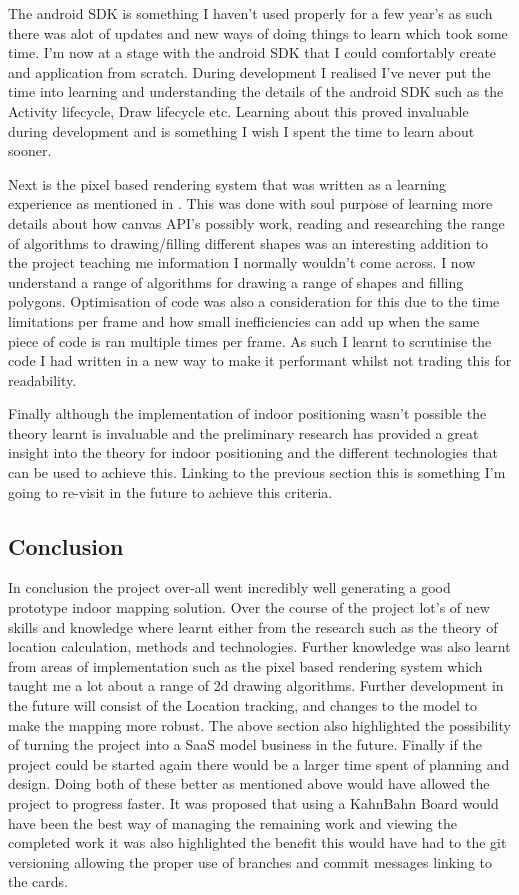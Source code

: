 The android SDK is something I haven't used properly for a few year's as such there was alot of updates and new ways of doing things to learn which took some time. I'm now at a stage with the android SDK that I could comfortably create and application from scratch. During development I realised I've never put the time into learning and understanding the details of the android SDK such as the Activity lifecycle, Draw lifecycle etc. Learning about this proved invaluable during development and is something I wish I spent the time to learn about sooner.

Next is the pixel based rendering system that was written as a learning experience as mentioned in \citetemp. This was done with soul purpose of learning more details about how canvas API's possibly work, reading and researching the range of algorithms to drawing/filling different shapes was an interesting addition to the project teaching me information I normally wouldn't come across. I now understand a range of algorithms for drawing a range of shapes and filling polygons. Optimisation of code was also a consideration for this due to the time limitations per frame and how small inefficiencies can add up when the same piece of code is ran multiple times per frame. As such I learnt to scrutinise the code I had written in a new way to make it performant whilst not trading this for readability.

Finally although the implementation of indoor positioning wasn't possible the theory learnt is invaluable and the preliminary research has provided a great insight into the theory for indoor positioning and the different technologies that can be used to achieve this. Linking to the previous section this is something I'm going to re-visit in the future to achieve this criteria.

\subsection{Conclusion}
In conclusion the project over-all went incredibly well generating a good prototype indoor mapping solution. Over the course of the project lot's of new skills and knowledge where learnt either from the research such as the theory of location calculation, methods and technologies. Further knowledge was also learnt from areas of implementation such as the pixel based rendering system which taught me a lot about a range of 2d drawing algorithms.
Further development in the future will consist of the Location tracking, and changes to the model to make the mapping more robust. The above section also highlighted the possibility of turning the project into a SaaS model business in the future.
Finally if the project could be started again there would be a larger time spent of planning and design. Doing both of these better as mentioned above would have allowed the project to progress faster. It was proposed that using a KahnBahn Board would have been the best way of managing the remaining work and viewing the completed work it was also highlighted the benefit this would have had to the git versioning allowing the proper use of branches and commit messages linking to the cards.
